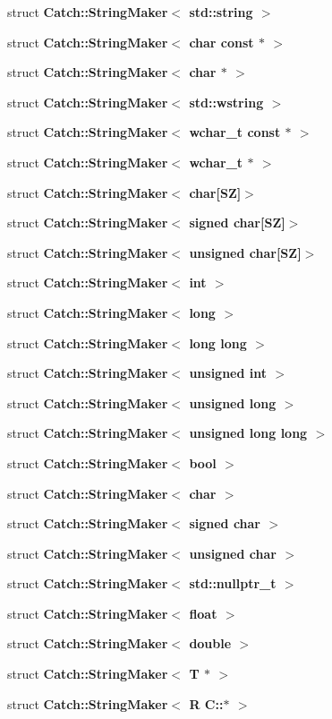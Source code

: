 \begin{DoxyCompactItemize}
struct \textbf{ Catch\+::\+String\+Maker$<$ std\+::string $>$}
\item 
struct \textbf{ Catch\+::\+String\+Maker$<$ char const $\ast$ $>$}
\item 
struct \textbf{ Catch\+::\+String\+Maker$<$ char $\ast$ $>$}
\item 
struct \textbf{ Catch\+::\+String\+Maker$<$ std\+::wstring $>$}
\item 
struct \textbf{ Catch\+::\+String\+Maker$<$ wchar\+\_\+t const $\ast$ $>$}
\item 
struct \textbf{ Catch\+::\+String\+Maker$<$ wchar\+\_\+t $\ast$ $>$}
\item 
struct \textbf{ Catch\+::\+String\+Maker$<$ char[\+S\+Z]$>$}
\item 
struct \textbf{ Catch\+::\+String\+Maker$<$ signed char[\+S\+Z]$>$}
\item 
struct \textbf{ Catch\+::\+String\+Maker$<$ unsigned char[\+S\+Z]$>$}
\item 
struct \textbf{ Catch\+::\+String\+Maker$<$ int $>$}
\item 
struct \textbf{ Catch\+::\+String\+Maker$<$ long $>$}
\item 
struct \textbf{ Catch\+::\+String\+Maker$<$ long long $>$}
\item 
struct \textbf{ Catch\+::\+String\+Maker$<$ unsigned int $>$}
\item 
struct \textbf{ Catch\+::\+String\+Maker$<$ unsigned long $>$}
\item 
struct \textbf{ Catch\+::\+String\+Maker$<$ unsigned long long $>$}
\item 
struct \textbf{ Catch\+::\+String\+Maker$<$ bool $>$}
\item 
struct \textbf{ Catch\+::\+String\+Maker$<$ char $>$}
\item 
struct \textbf{ Catch\+::\+String\+Maker$<$ signed char $>$}
\item 
struct \textbf{ Catch\+::\+String\+Maker$<$ unsigned char $>$}
\item 
struct \textbf{ Catch\+::\+String\+Maker$<$ std\+::nullptr\+\_\+t $>$}
\item 
struct \textbf{ Catch\+::\+String\+Maker$<$ float $>$}
\item 
struct \textbf{ Catch\+::\+String\+Maker$<$ double $>$}
\item 
struct \textbf{ Catch\+::\+String\+Maker$<$ T $\ast$ $>$}
\item 
struct \textbf{ Catch\+::\+String\+Maker$<$ R C\+::$\ast$ $>$}
\item 

\end{DoxyCompactItemize}
